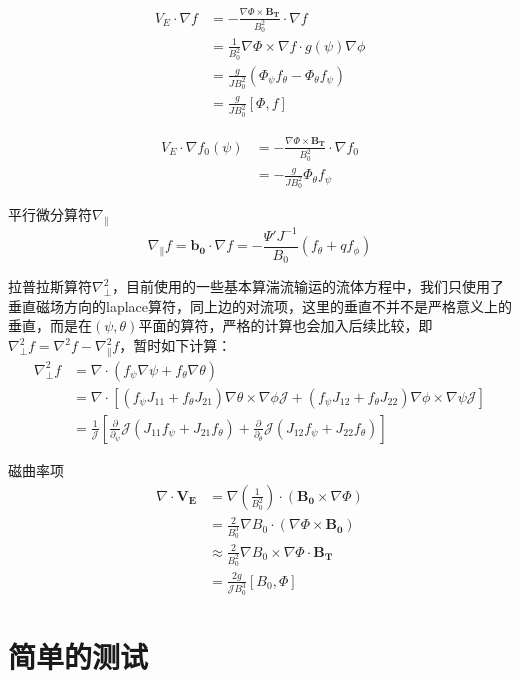 \documentclass[11pt,a4paper]{article}
\begin{document}
$$
\begin{aligned}
V_E\cdot\nabla f
&= -\frac{\nabla\Phi\times\pmb{B_T}}{B^2_0}\cdot\nabla f \\  
&= \frac{1}{B_0^2}\nabla\Phi\times\nabla f\cdot g(\psi)\nabla\phi \\ 
&= \frac{g}{JB^2_0}(\Phi_\psi f_\theta - \Phi_\theta f_\psi) \\
&= \frac{g}{JB^2_0}[\Phi,f] 
\end{aligned}    
$$	
	
$$
\begin{aligned}
V_E\cdot\nabla f_0(\psi)
&= -\frac{\nabla\Phi\times\pmb{B_T}}{B^2_0}\cdot\nabla f_0 \\
&= -\frac{g}{JB^2_0} \Phi_\theta f_\psi
\end{aligned}
$$
	
平行微分算符$\nabla_\parallel$
$$ 
\nabla_\parallel f = \pmb{b_0}\cdot\nabla f = -\frac{\Psi'J^{-1}}{B_0}(f_\theta + qf_\phi)  
$$
	
拉普拉斯算符$\nabla^2_\perp$，目前使用的一些基本算湍流输运的流体方程中，我们只使用了垂直磁场方向的laplace算符，同上边的对流项，这里的垂直不并不是严格意义上的垂直，而是在$(\psi,\theta)$平面的算符，严格的计算也会加入后续比较，即$\nabla^2_\perp f= \nabla^2 f - \nabla^2_\parallel f$，暂时如下计算：
$$
\begin{aligned}
\nabla_\perp^2 f  
&= \nabla\cdot(f_\psi \nabla\psi + f_\theta\nabla\theta) \\
&= \nabla\cdot[ (f_\psi J_{11} + f_\theta J_{21}) \nabla\theta\times\nabla\phi\mathcal{J} + (f_\psi J_{12}+f_\theta J_{22}) \nabla\phi\times\nabla\psi\mathcal{J} ] \\
&= \frac{1}{\mathcal{J}} 
[ \frac{\partial}{\partial_\psi}\mathcal{J}(J_{11}f_\psi + J_{21}f_\theta) 
+\frac{\partial}{\partial_\theta}\mathcal{J}(J_{12}f_\psi + J_{22}f_\theta) ]  
\end{aligned}
$$

磁曲率项
$$
\begin{aligned}
\nabla\cdot{\pmb{V_E}} 
&= \nabla(\frac{1}{B_0^2})\cdot(\pmb{B_0}\times\nabla\Phi) \\
&= \frac{2}{B_0^3}\nabla{B_0}\cdot(\nabla\Phi\times\pmb{B_0}) \\
&\approx \frac{2}{B_0^2}\nabla{B_0}\times\nabla\Phi\cdot\pmb{B_T}    \\
&= \frac{2g}{\mathcal{J}B_0^3}[B_0,\Phi]  
\end{aligned}
$$

\section{简单的测试}
\end{document}

